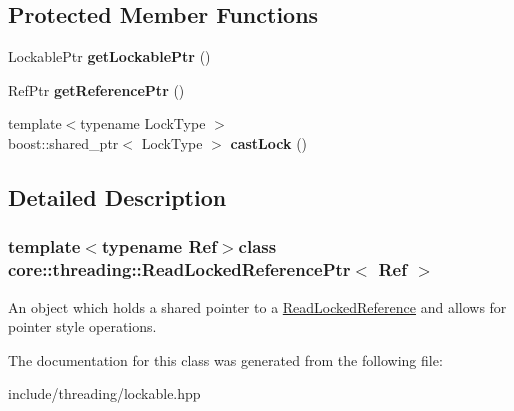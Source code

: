 \subsection*{Protected Member Functions}
\begin{DoxyCompactItemize}
\item 
\hypertarget{classcore_1_1threading_1_1_read_locked_reference_ptr_aab992e142cc146349cd0ca5f74492430}{Lockable\-Ptr {\bfseries get\-Lockable\-Ptr} ()}\label{classcore_1_1threading_1_1_read_locked_reference_ptr_aab992e142cc146349cd0ca5f74492430}

\item 
\hypertarget{classcore_1_1threading_1_1_read_locked_reference_ptr_a2b483b41d8b1278c597fc63cb31ac18d}{Ref\-Ptr {\bfseries get\-Reference\-Ptr} ()}\label{classcore_1_1threading_1_1_read_locked_reference_ptr_a2b483b41d8b1278c597fc63cb31ac18d}

\item 
\hypertarget{classcore_1_1threading_1_1_read_locked_reference_ptr_a3e58e4528037067845574fb5dba5c7d0}{{\footnotesize template$<$typename Lock\-Type $>$ }\\boost\-::shared\-\_\-ptr$<$ Lock\-Type $>$ {\bfseries cast\-Lock} ()}\label{classcore_1_1threading_1_1_read_locked_reference_ptr_a3e58e4528037067845574fb5dba5c7d0}

\end{DoxyCompactItemize}


\subsection{Detailed Description}
\subsubsection*{template$<$typename Ref$>$class core\-::threading\-::\-Read\-Locked\-Reference\-Ptr$<$ Ref $>$}

An object which holds a shared pointer to a \hyperlink{classcore_1_1threading_1_1_read_locked_reference}{Read\-Locked\-Reference} and allows for pointer style operations. 

The documentation for this class was generated from the following file\-:\begin{DoxyCompactItemize}
\item 
include/threading/lockable.\-hpp\end{DoxyCompactItemize}
